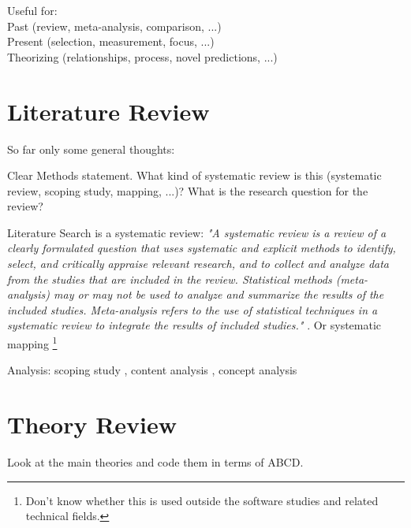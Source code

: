 \documentclass[nobib]{tufte-handout}
\begin{document}
 Useful for:\\
Past (review, meta-analysis, comparison, ...)\\
Present (selection, measurement, focus, ...)\\
Theorizing (relationships, process, novel predictions, ...)

\section{Literature Review}

So far only some general thoughts:

Clear Methods statement. What kind of systematic review is this (systematic review, scoping study, mapping, ...)? What is the research question for the review?

Literature Search is a systematic review: \textit{"A systematic review is a review of a clearly formulated question that uses systematic and explicit methods to identify, select, and critically appraise relevant research, and to collect and analyze data from the studies that are included in the review. Statistical methods (meta-analysis) may or may not be used to analyze and summarize the results of the included studies. Meta-analysis refers to the use of statistical techniques in a systematic review to integrate the results of included studies."} \citep[p.1]{Moher2009}. Or systematic mapping \citep{Petersen2015}\footnote{Don't know whether this is used outside the software studies and related technical fields.}

Analysis: scoping study \citep{Arksey2005},  content analysis \citep{Mikkonen2020, Yoon2011}, concept analysis \citep{Siatkowski2007}

\section{Theory Review}
Look at the main theories and code them in terms of ABCD.
\end{document}
